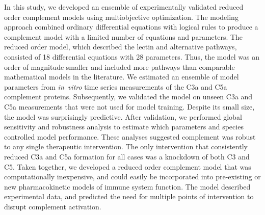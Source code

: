 \documentclass[12pt]{article}
\begin{document}


In this study, we developed an ensemble of experimentally validated reduced order complement models using multiobjective optimization.
The modeling approach combined ordinary differential equations with logical rules to produce a complement model with a limited number of equations and parameters.
The reduced order model,  which described the lectin and alternative pathways, consisted of 18 differential equations with 28 parameters.
Thus, the model was an order of magnitude smaller and included more pathways than comparable mathematical models in the literature.
We estimated an ensemble of model parameters from \textit{in~vitro} time series measurements of the C3a and C5a complement proteins.
Subsequently, we validated the model on unseen C3a and C5a measurements that were not used for model training.
Despite its small size, the model was surprisingly predictive.
After validation, we performed global sensitivity and robustness analysis to estimate which parameters and species
controlled model performance. These analyses suggested complement was robust to any single therapeutic intervention.
The only intervention that consistently reduced C3a and C5a formation for all cases was a knockdown of both C3 and C5.
Taken together, we developed a reduced order complement model that was computationally inexpensive,
and could easily be incorporated into pre-existing or new pharmacokinetic models of immune system function.
The model described experimental data, and predicted the need for multiple points of intervention to disrupt complement activation.
\end{document}
